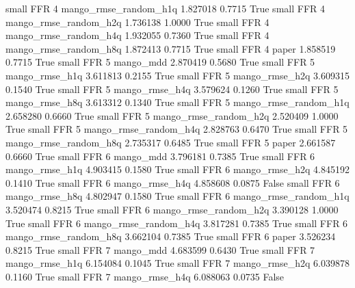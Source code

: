      small      FFR                 4 mango_rmse_random_h1q   1.827018      0.7715    True
     small      FFR                 4 mango_rmse_random_h2q   1.736138      1.0000    True
     small      FFR                 4 mango_rmse_random_h4q   1.932055      0.7360    True
     small      FFR                 4 mango_rmse_random_h8q   1.872413      0.7715    True
     small      FFR                 4                 paper   1.858519      0.7715    True
     small      FFR                 5             mango_mdd   2.870419      0.5680    True
     small      FFR                 5        mango_rmse_h1q   3.611813      0.2155    True
     small      FFR                 5        mango_rmse_h2q   3.609315      0.1540    True
     small      FFR                 5        mango_rmse_h4q   3.579624      0.1260    True
     small      FFR                 5        mango_rmse_h8q   3.613312      0.1340    True
     small      FFR                 5 mango_rmse_random_h1q   2.658280      0.6660    True
     small      FFR                 5 mango_rmse_random_h2q   2.520409      1.0000    True
     small      FFR                 5 mango_rmse_random_h4q   2.828763      0.6470    True
     small      FFR                 5 mango_rmse_random_h8q   2.735317      0.6485    True
     small      FFR                 5                 paper   2.661587      0.6660    True
     small      FFR                 6             mango_mdd   3.796181      0.7385    True
     small      FFR                 6        mango_rmse_h1q   4.903415      0.1580    True
     small      FFR                 6        mango_rmse_h2q   4.845192      0.1410    True
     small      FFR                 6        mango_rmse_h4q   4.858608      0.0875   False
     small      FFR                 6        mango_rmse_h8q   4.802947      0.1580    True
     small      FFR                 6 mango_rmse_random_h1q   3.520474      0.8215    True
     small      FFR                 6 mango_rmse_random_h2q   3.390128      1.0000    True
     small      FFR                 6 mango_rmse_random_h4q   3.817281      0.7385    True
     small      FFR                 6 mango_rmse_random_h8q   3.662104      0.7385    True
     small      FFR                 6                 paper   3.526234      0.8215    True
     small      FFR                 7             mango_mdd   4.683599      0.6430    True
     small      FFR                 7        mango_rmse_h1q   6.154084      0.1045    True
     small      FFR                 7        mango_rmse_h2q   6.039878      0.1160    True
     small      FFR                 7        mango_rmse_h4q   6.088063      0.0735   False
